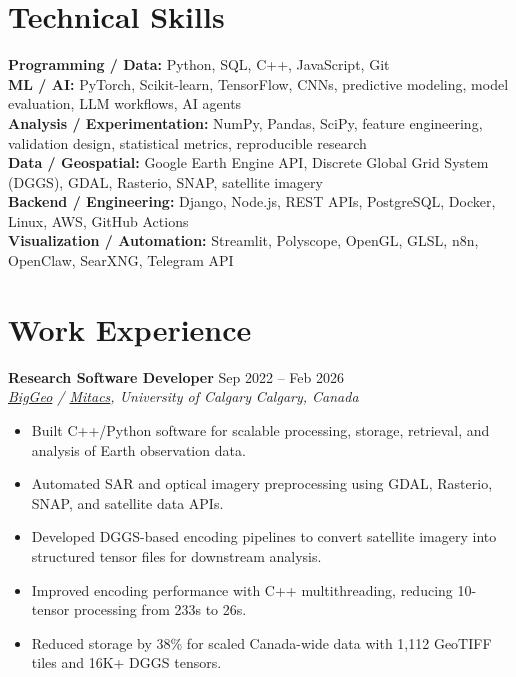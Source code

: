 \documentclass[a4paper,10pt]{article}
\newcommand{\resumeSubheading}[4]{
    \textbf{#1} \hfill #2 \\
    \textit{#3} \hfill \textit{#4}
}
\begin{document}
\section*{Technical Skills}

\textbf{Programming / Data:} Python, SQL, C++, JavaScript, Git \\
\textbf{ML / AI:} PyTorch, Scikit-learn, TensorFlow, CNNs, predictive modeling, model evaluation, LLM workflows, AI agents \\
\textbf{Analysis / Experimentation:} NumPy, Pandas, SciPy, feature engineering, validation design, statistical metrics, reproducible research \\
\textbf{Data / Geospatial:} Google Earth Engine API, Discrete Global Grid System (DGGS), GDAL, Rasterio, SNAP, satellite imagery \\
\textbf{Backend / Engineering:} Django, Node.js, REST APIs, PostgreSQL, Docker, Linux, AWS, GitHub Actions \\
\textbf{Visualization / Automation:} Streamlit, Polyscope, OpenGL, GLSL, n8n, OpenClaw, SearXNG, Telegram API


\section*{Work Experience}

\resumeSubheading
{Research Software Developer}
{Sep 2022 -- Feb 2026}
{\href{https://biggeo.com}{BigGeo} / \href{https://www.mitacs.ca/}{Mitacs}, University of Calgary}
{Calgary, Canada}
\begin{itemize}[leftmargin=0.25in]
    \item Built C++/Python software for scalable processing, storage, retrieval, and analysis of Earth observation data.
    \item Automated SAR and optical imagery preprocessing using GDAL, Rasterio, SNAP, and satellite data APIs.
    \item Developed DGGS-based encoding pipelines to convert satellite imagery into structured tensor files for downstream analysis.
    \item Improved encoding performance with C++ multithreading, reducing 10-tensor processing from 233s to 26s.
    \item Reduced storage by 38\% for scaled Canada-wide data with 1,112 GeoTIFF tiles and 16K+ DGGS tensors.
\end{itemize}
\end{document}
